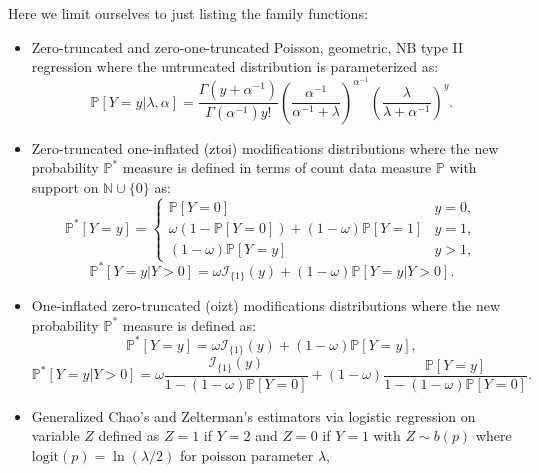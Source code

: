 \documentclass[
]{jss}
\newcommand{\1}{\mathcal{I}} \newcommand{\bx}{\boldsymbol{x}}
\begin{document}
Here we limit ourselves to just listing the family functions:

\begin{itemize}
    \item Zero-truncated and zero-one-truncated Poisson, geometric, NB type II regression where the untruncated distribution is parameterized as:
    \begin{equation*}
        \mathbb{P}[Y=y|\lambda,\alpha] = \frac{\Gamma\left(y+\alpha^{-1}\right)}{\Gamma\left(\alpha^{-1}\right)y!}
        \left(\frac{\alpha^{-1}}{\alpha^{-1}+\lambda}\right)^{\alpha^{-1}}
        \left(\frac{\lambda}{\lambda + \alpha^{-1}}\right)^{y}.
    \end{equation*}
    \item Zero-truncated one-inflated (ztoi) modifications distributions where the new probability $\mathbb{P}^{\ast}$ measure is defined in terms of count data measure $\mathbb{P}$ with support on $\mathbb{N}\cup\{0\}$ as:
    \begin{equation*}
    \mathbb{P}^{\ast}[Y=y]=
    \begin{cases}
    \mathbb{P}[Y=0] & y=0, \\
    \omega\left(1-\mathbb{P}[Y=0]\right)+(1-\omega)\mathbb{P}[Y=1] & y=1, \\
    (1-\omega)\mathbb{P}[Y=y] & y>1,
    \end{cases}
    \end{equation*}
    \begin{equation*}
        \mathbb{P}^{\ast}[Y=y|Y>0]=\omega\mathcal{I}_{\{1\}}(y)+(1-\omega)\mathbb{P}[Y=y|Y>0].
    \end{equation*}
    \item One-inflated zero-truncated (oizt) modifications distributions where the new probability $\mathbb{P}^{\ast}$ measure is defined as:
    \begin{equation*}
        \mathbb{P}^{\ast}[Y=y] = \omega \mathcal{I}_{\{1\}}(y)+(1-\omega)\mathbb{P}[Y=y],
    \end{equation*}
    \begin{equation*}
        \mathbb{P}^{\ast}[Y=y|Y>0] = 
        \omega\frac{\mathcal{I}_{\{1\}}(y)}{1-(1-\omega)\mathbb{P}[Y=0]}+
        (1-\omega)\frac{\mathbb{P}[Y=y]}{1-(1-\omega)\mathbb{P}[Y=0]}.
    \end{equation*}
    \item Generalized Chao's and Zelterman's estimators via logistic regression on variable $Z$ defined as $Z=1$ if $Y=2$ and $Z=0$ if $Y=1$ with $Z\sim b(p)$ where $\text{logit}(p)=\ln(\lambda/2)$ for poisson parameter $\lambda$,

\end{itemize}
\end{document}
